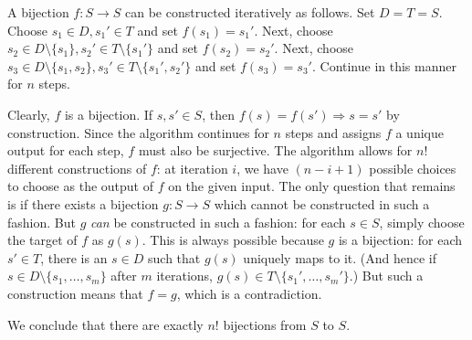 \documentclass[a4paper]{report}
\newenvironment{ex}[1]
    {\noindent{\large \bf Exercise #1.}}{\vspace{0.5cm}}
\begin{document}
\begin{ex}{2.1}
  A bijection $f : S \rightarrow S$ can be constructed iteratively as
  follows. Set $D = T = S$.  Choose $s_1 \in D, s_1' \in T$ and set
  $f(s_1) = s_1'$. Next, choose $s_2 \in D \setminus \{s_1\}, s_2' \in
  T \setminus \{s_1'\}$ and set $f(s_2) = s_2'$.  Next, choose $s_3
  \in D \setminus \{s_1, s_2\}, s_3' \in T \setminus \{s_1',s_2'\}$
  and set $f(s_3) = s_3'$.  Continue in this manner for $n$ steps.

  Clearly, $f$ is a bijection. If $s, s' \in S$, then $f(s) = f(s')
  \Rightarrow s = s'$ by construction.  Since the algorithm continues
  for $n$ steps and assigns $f$ a unique output for each step, $f$
  must also be surjective.  The algorithm allows for $n!$ different
  constructions of $f$: at iteration $i$, we have $(n-i + 1)$ possible
  choices to choose as the output of $f$ on the given input. The only
  question that remains is if there exists a bijection $g : S
  \rightarrow S$ which cannot be constructed in such a fashion.  But
  $g$ \emph{can} be constructed in such a fashion: for each $s \in S$,
  simply choose the target of $f$ as $g(s)$. This is always possible
  because $g$ is a bijection: for each $s' \in T$, there is an $s \in
  D$ such that $g(s)$ uniquely maps to it. (And hence if $s \in D
  \setminus \{s_1, \dots, s_m\}$ after $m$ iterations, $g(s) \in T
  \setminus \{s_1', \dots, s_m'\}$.) But such a construction means
  that $f = g$, which is a contradiction.

  We conclude that there are exactly $n!$ bijections from $S$ to $S$.
  
\end{ex}
\end{document}

